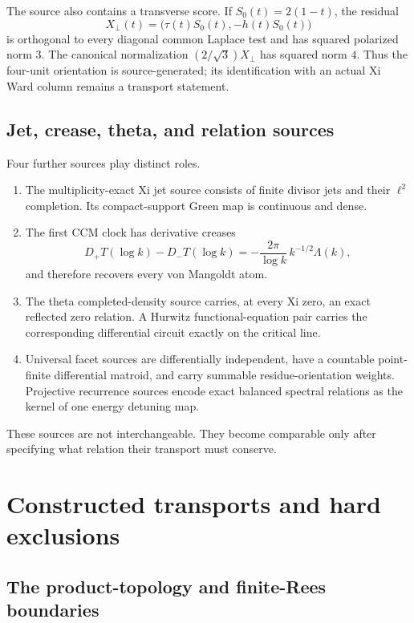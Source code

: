 \documentclass[11pt]{article}
\theoremstyle{definition}
\theoremstyle{remark}
\begin{document}
The source also contains a transverse score.  If
\(S_0(t)=2(1-t)\), the residual
\[
 X_\perp(t)=\bigl(\tau(t)S_0(t),-h(t)S_0(t)\bigr)
\tag{3.13}\label{eq:transverse}
\]
is orthogonal to every diagonal common Laplace test and has squared
polarized norm \(3\).  The canonical normalization
\((2/\sqrt3)X_\perp\) has squared norm \(4\).  Thus the four-unit
orientation is source-generated; its identification with an actual Xi
Ward column remains a transport statement.

\subsection{Jet, crease, theta, and relation sources}

Four further sources play distinct roles.
\begin{enumerate}[leftmargin=2.2em]
\item The multiplicity-exact Xi jet source consists of finite divisor jets
      and their \(\ell^2\) completion.  Its compact-support Green map is
      continuous and dense.
\item The first CCM clock has derivative creases
      \[
      D_+T(\log k)-D_-T(\log k)
       =-\frac{2\pi}{\log k}\,k^{-1/2}\Lambda(k),
      \tag{3.14}\label{eq:ccm-crease}
      \]
      and therefore recovers every von Mangoldt atom.
\item The theta completed-density source carries, at every Xi zero, an
      exact reflected zero relation.  A Hurwitz functional-equation pair
      carries the corresponding differential circuit exactly on the
      critical line.
\item Universal facet sources are differentially independent, have a
      countable point-finite differential matroid, and carry summable
      residue-orientation weights.  Projective recurrence
      sources encode exact balanced spectral relations as the kernel of
      one energy detuning map.
\end{enumerate}
These sources are not interchangeable.  They become comparable only
after specifying what relation their transport must conserve.

\section{Constructed transports and hard exclusions}
\label{sec:transport}

\subsection{The product-topology and finite-Rees boundaries}
\end{document}
